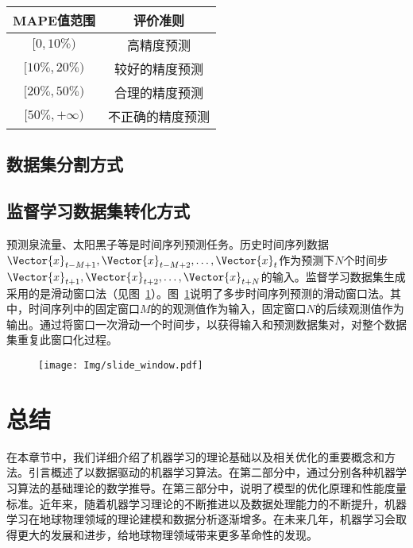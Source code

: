 \begin{table}[!htbp]
    \label{tab:MAPE_Criteria}
    \centering
    \footnotesize
    \setlength{\tabcolsep}{4pt}
    \renewcommand{\arraystretch}{1.2}%
    \begin{tabular}{cc}
        \hline
        MAPE值范围 & 评价准则\\
        \hline
        $[0,10\%)$ & 高精度预测  \\
        $[10\%,20\%)$ & 较好的精度预测  \\
        $[20\%,50\%)$ & 合理的精度预测  \\
        $[50\%,+\infty)$ & 不正确的精度预测  \\
        \hline
    \end{tabular}
\end{table}


\subsection{数据集分割方式}

\subsection{监督学习数据集转化方式}
预测泉流量、太阳黑子等是时间序列预测任务。历史时间序列数据$\Vector{x}_{t-M+1},\Vector{x}_{t-M+2},\ldots,\Vector{x}_{t}$作为预测下$N$个时间步$\Vector{x}_{t+1},\Vector{x}_{t+2},\ldots,\Vector{x}_{t+N}$的输入。监督学习数据集生成采用的是滑动窗口法（见图~\ref{fig:slide_window}）。图~\ref{fig:slide_window}说明了多步时间序列预测的滑动窗口法。其中，时间序列中的固定窗口$M$的的观测值作为输入，固定窗口$N$的后续观测值作为输出。通过将窗口一次滑动一个时间步，以获得输入和预测数据集对，对整个数据集重复此窗口化过程。

\begin{figure}[!htbp]
    \centering
    \texttt{[image: Img/slide\_window.pdf]}
    \label{fig:slide_window}
\end{figure}

\section{总结}\label{sec:ann_总结}

在本章节中，我们详细介绍了机器学习的理论基础以及相关优化的重要概念和方法。引言概述了以数据驱动的机器学习算法。在第二部分中，通过分别各种机器学习算法的基础理论的数学推导。在第三部分中，说明了模型的优化原理和性能度量标准。近年来，随着机器学习理论的不断推进以及数据处理能力的不断提升，机器学习在地球物理领域的理论建模和数据分析逐渐增多。在未来几年，机器学习会取得更大的发展和进步，给地球物理领域带来更多革命性的发现。